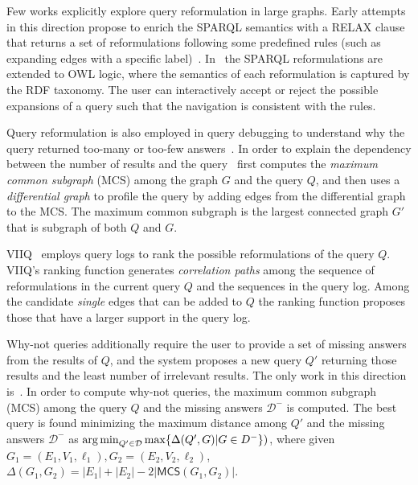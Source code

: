 Few works explicitly explore query reformulation in large graphs.
Early attempts in this direction propose to enrich the SPARQL semantics with a \textsc{RELAX} clause that returns a set of reformulations following some predefined rules (such as expanding edges with a specific label)~\citep{hurtado2008query}.
In~\citep{arenas2014faceted} the SPARQL reformulations are extended to OWL logic, where the semantics of each reformulation is captured by the RDF taxonomy. 
The user can interactively accept or reject the possible expansions of a query such that the navigation is consistent with the rules. 

Query reformulation is also employed in query debugging to understand why the query returned too-many or too-few answers~\citep{vasilyeva2016answering}. 
In order to explain the dependency between the number of results and the query~\citep{vasilyeva2016answering} first computes the \emph{maximum common subgraph} (MCS) among the graph $G$ and the query $Q$, and then uses a \emph{differential graph} to profile the query by adding edges from the differential graph to the MCS. 
The maximum common subgraph is the largest connected graph $G'$ that is subgraph of both $Q$ and $G$. 

VIIQ~\cite{jayaram2015viiq} employs query logs to rank the possible reformulations of the query $Q$. 
VIIQ's ranking function generates \emph{correlation paths} among the sequence of reformulations in the current query $Q$ and the sequences in the query log. 
Among the candidate \emph{single} edges that can be added to $Q$ the ranking function proposes those that have a larger support in the query log. 



Why-not queries additionally require the user to provide a set of missing answers from the results of $Q$, and the system proposes a new query $Q'$ returning those results and the least number of irrelevant results. 
The only work in this direction is~\cite{islam2015efficient}. 
In order to compute why-not queries, the maximum common subgraph (MCS) among the query $Q$ and the missing answers $\mathcal{D}^-$ is computed. The best query is found minimizing the maximum distance among $Q'$ and the missing answers $\mathcal{D}^-$ as $\operatorname*{\arg\min}_{Q'\in \mathcal{D}} \max\{\Delta(Q',G)|G \in D^{-}\})$, where given $G_1 = (E_1,V_1, \ell_1), G_2 = (E_2,V_2, \ell_2)$, $\Delta(G_1, G_2) = |E_1| + |E_2| - 2 |\mathsf{MCS}(G_1,G_2)|$. 


